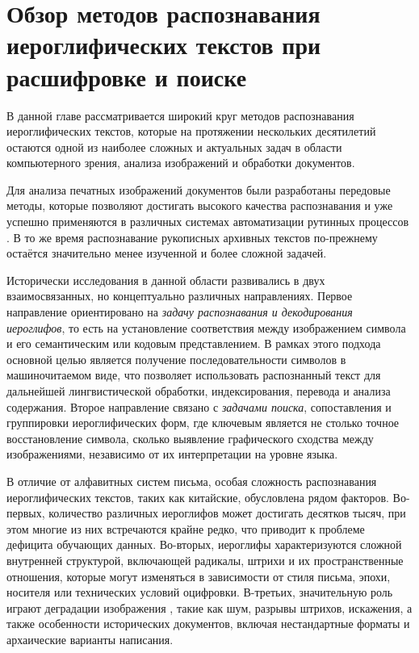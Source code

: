 \chapter{Обзор методов распознавания иероглифических текстов при расшифровке и поиске}\label{ch:ch1}

В данной главе рассматривается широкий круг методов распознавания иероглифических текстов, которые на протяжении нескольких десятилетий остаются одной из наиболее сложных и актуальных задач в области компьютерного зрения, анализа изображений и обработки документов.

Для анализа печатных изображений документов были разработаны передовые методы, которые позволяют достигать высокого качества распознавания и уже успешно применяются в различных системах автоматизации рутинных процессов \cite{reisswig2019chargrid, smith2007overview, du2009pp, li2023trocr, xu2020layoutlm}. В то же время распознавание рукописных архивных текстов по-прежнему остаётся значительно менее изученной и более сложной задачей.

Исторически исследования в данной области развивались в двух взаимосвязанных, но концептуально различных направлениях. Первое направление ориентировано на \textit{задачу распознавания и декодирования иероглифов}, то есть на установление соответствия между изображением символа и его семантическим или кодовым представлением. В рамках этого подхода основной целью является получение последовательности символов в машиночитаемом виде, что позволяет использовать распознанный текст для дальнейшей лингвистической обработки, индексирования, перевода и анализа содержания. Второе направление связано с \textit{задачами поиска}, сопоставления и группировки иероглифических форм, где ключевым является не столько точное восстановление символа, сколько выявление графического сходства между изображениями, независимо от их интерпретации на уровне языка.

В отличие от алфавитных систем письма, особая сложность распознавания иероглифических текстов, таких как китайские, обусловлена рядом факторов. Во-первых, количество различных иероглифов может достигать десятков тысяч, при этом многие из них встречаются крайне редко, что приводит к проблеме дефицита обучающих данных. Во-вторых, иероглифы характеризуются сложной внутренней структурой, включающей радикалы, штрихи и их пространственные отношения, которые могут изменяться в зависимости от стиля письма, эпохи, носителя или технических условий оцифровки. В-третьих, значительную роль играют деградации изображения \cite{shi2023m5hisdoc}, такие как шум, разрывы штрихов, искажения, а также особенности исторических документов, включая нестандартные форматы и архаические варианты написания.


